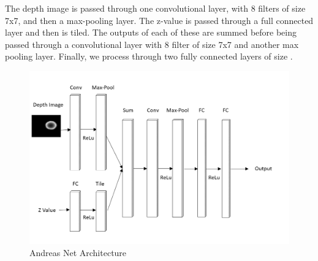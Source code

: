 The depth image is passed through one convolutional layer, with 8 filters of size 7x7, and then a max-pooling layer. 
The z-value is passed through a full connected layer and then is tiled.
 
The outputs of each of these are summed before being passed through a convolutional layer with 8 filter of size 7x7 and another max pooling layer. 
Finally, we process through two fully connected layers of size . 


\begin{figure}[t!]
    \includegraphics[width=0.99\columnwidth]{figs/andreas_net.png}
\caption{Andreas Net Architecture} \label{fig:andreas_net}
\end{figure}